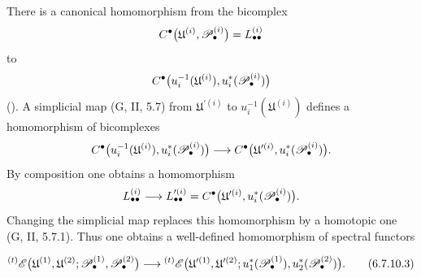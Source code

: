 \begin{env}[6.7.10]
There is a canonical homomorphism from the bicomplex
\[
  C^\bullet
  \bigl(
    \mathfrak U^{(i)},\mathscr{P}_\bullet^{(i)}
  \bigr)
  =
  L_{\bullet\bullet}^{(i)}
\]
to
\[
  C^\bullet
  \bigl(
    u_i^{-1}(\mathfrak U^{(i)}),
    u_i^*(\mathscr{P}_\bullet^{(i)})
  \bigr)
\]
().  A simplicial map
\textnormal{(G, II, 5.7)} from $\mathfrak U^{\prime(i)}$ to
$u_i^{-1}(\mathfrak U^{(i)})$ defines a homomorphism of
bicomplexes
\[
  C^\bullet
  \bigl(
    u_i^{-1}(\mathfrak U^{(i)}),
    u_i^*(\mathscr{P}_\bullet^{(i)})
  \bigr)
  \longrightarrow
  C^\bullet
  \bigl(
    \mathfrak U^{\prime(i)},
    u_i^*(\mathscr{P}_\bullet^{(i)})
  \bigr).
\]
By composition one obtains a homomorphism
\[
  L_{\bullet\bullet}^{(i)}
  \longrightarrow
  L_{\bullet\bullet}^{\prime(i)}
  =
  C^\bullet
  \bigl(
    \mathfrak U^{\prime(i)},
    u_i^*(\mathscr{P}_\bullet^{(i)})
  \bigr).
\]
Changing the simplicial map replaces this homomorphism by a
homotopic one \textnormal{(G, II, 5.7.1)}.  Thus one obtains a
well-defined homomorphism of spectral functors
\begin{env}[6.7.10.3]
\label{III.6.7.10.3}
\[
  {}^{(t)}\sh E
  \bigl(
    \mathfrak U^{(1)},\mathfrak U^{(2)};
    \sh P_\bullet^{(1)},\sh P_\bullet^{(2)}
  \bigr)
  \longrightarrow
  {}^{(t)}\sh E
  \bigl(
    \mathfrak U^{\prime(1)},\mathfrak U^{\prime(2)};
    u_1^*(\sh P_\bullet^{(1)}),
    u_2^*(\sh P_\bullet^{(2)})
  \bigr).
  \tag{6.7.10.3}\label{III.6.7.10.3.eq}
\]
\end{env}


\end{env}
